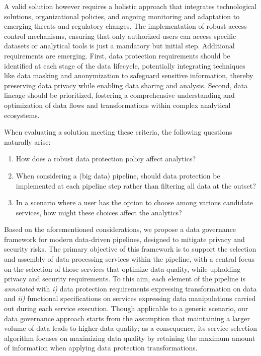 A valid solution however requires a holistic approach that integrates technological solutions, organizational policies, and ongoing monitoring and adaptation to emerging threats and regulatory changes. The implementation of robust access control mechanisms, ensuring that only authorized users can access specific datasets or analytical tools is just a mandatory but initial step. Additional requirements are emerging. First, data protection requirements should be identified at each stage of the data lifecycle, potentially integrating techniques like data masking and anonymization to safeguard sensitive information, thereby preserving data privacy while enabling data sharing and analysis. Second, data lineage should be prioritized, fostering a comprehensive understanding and optimization of data flows and transformations within complex analytical ecosystems. 

When evaluating a solution meeting these criteria, the following questions naturally arise:
\begin{enumerate}
\item How does a robust data protection policy affect analytics?
\item When considering a (big data) pipeline, should data protection be implemented at each pipeline step rather than filtering all data at the outset? 
\item In a scenario where a user has the option to choose among various candidate services, how might these choices affect the analytics?
\end{enumerate}

Based on the aforementioned considerations, we propose a data governance framework for modern data-driven pipelines, designed to mitigate privacy and security risks. The primary objective of this framework is to support the selection and assembly of data processing services within the pipeline, with a central focus on the selection of those services that optimize data quality, while upholding privacy and security requirements. 
To this aim, each element of the pipeline is \textit{annotated} with \emph{i)} data protection requirements expressing transformation on data and \emph{ii)} functional specifications on services expressing data manipulations carried out during each service execution. 
Though applicable to a generic scenario, our data governance approach starts from the assumption that maintaining a larger volume of data leads to higher data quality; as a consequence, its service selection algorithm focuses on maximizing data quality by retaining the maximum amount of information when applying data protection transformations. 

